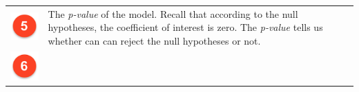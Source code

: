 \documentclass[]{article}
\begin{document}
\begin{longtable}[]{@{}ll@{}}
\begin{minipage}[t]{0.07\columnwidth}
\includegraphics[width=1\textwidth,height=\textheight]{./img/circle5.png}\strut
\end{minipage} & \begin{minipage}[t]{0.87\columnwidth}\raggedright
The \emph{p-value} of the model. Recall that according to the null hypotheses, the coefficient of interest is zero. The \emph{p-value} tells us whether can can reject the null hypotheses or not.\strut
\end{minipage}\tabularnewline
\begin{minipage}[t]{0.07\columnwidth}\raggedright
\includegraphics[width=1\textwidth,height=\textheight]{./img/circle6.png}\strut

\end{minipage}
\end{longtable}
\end{document}
